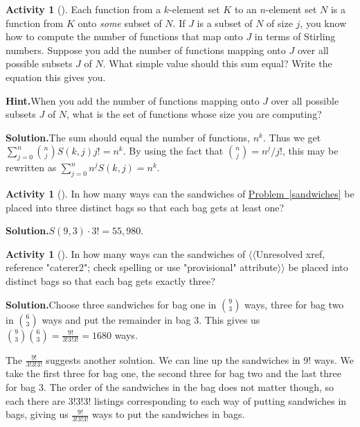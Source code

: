 \documentclass[10pt,]{book}
\theoremstyle{plain}
\theoremstyle{definition}
\newtheorem{activity}[project]{Activity}
\numberwithin{equation}{chapter}
\begin{document}
\begin{activity}[]\label{Stirlingfalling}
Each function from a \(k\)-element set \(K\) to an \(n\)-element set \(N\) is a function from \(K\) onto \emph{some} subset of \(N\). If \(J\) is a subset of \(N\) of size \(j\), you know how to compute the number of functions that map onto \(J\) in terms of Stirling numbers. Suppose you add the number of functions mapping onto \(J\) over all possible subsets \(J\) of \(N\). What simple value should this sum equal? Write the equation this gives you.%
\par\medskip\noindent%
\textbf{Hint.}\quad When you add the number of functions mapping onto \(J\) over all possible subsets \(J\) of \(N\), what is the set of functions whose size you are computing?%
\par\medskip\noindent%
\textbf{Solution.}\quad The sum should equal the number of functions, \(n^k\). Thus we get \(\sum_{j=0}^n \binom{n}{j}S(k,j)j! = n^k\). By using the fact that \(\binom{n}{j}= n^{\underline{j}}/j!\), this may be rewritten as \(\sum_{j=0}^n n^{\underline{j}}S(k,j) = n^k.\)%
\end{activity}
\begin{activity}[]\label{activity-136}
In how many ways can the sandwiches of \hyperref[sandwiches]{Problem~\ref{sandwiches}} be placed into three distinct bags so that each bag gets at least one?%
\par\medskip\noindent%
\textbf{Solution.}\quad \(S(9,3)\cdot3!= 55,980\).%
\end{activity}
\begin{activity}[]\label{activity-137}
In how many ways can the sandwiches of {$\langle\langle$Unresolved xref, reference "caterer2"; check spelling or use "provisional" attribute$\rangle\rangle$} be placed into distinct bags so that each bag gets exactly three?%
\par\medskip\noindent%
\textbf{Solution.}\quad Choose three sandwiches for bag one in \(\binom{9}{3}\) ways, three for bag two in \(\binom{6}{3}\) ways and put the remainder in bag 3.  This gives us \(\binom{9}{3}\binom{6}{3}=\frac{9!}{3!3!3!}=1680\) ways.%
\par
The \(\frac{9!}{3!3!3!}\) suggests another solution. We can line up the sandwiches in 9! ways. We take the first three for bag one, the second three for bag two and the last three for bag 3. The order of the sandwiches in the bag does not matter though, so each there are \(3!3!3!\) listings corresponding to each way of putting sandwiches in bags, giving us \(\frac{9!}{3!3!3!}\) ways to put the sandwiches in bags.%
\end{activity}
\end{document}
